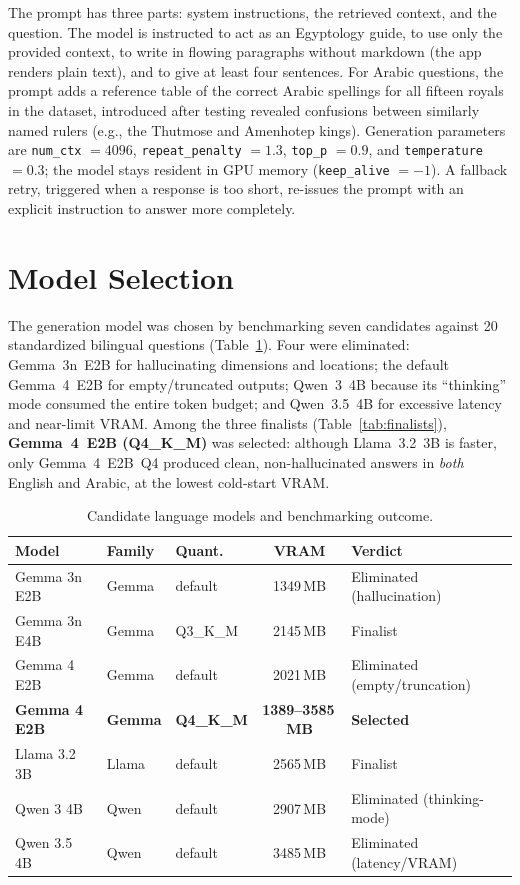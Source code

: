 The prompt has three parts: system instructions, the retrieved context, and the
question. The model is instructed to act as an Egyptology guide, to use only the
provided context, to write in flowing paragraphs without markdown (the app renders
plain text), and to give at least four sentences. For Arabic questions, the prompt adds
a reference table of the correct Arabic spellings for all fifteen royals in the dataset,
introduced after testing revealed confusions between similarly named rulers
(e.g., the Thutmose and Amenhotep kings). Generation parameters are \texttt{num\_ctx}
$=4096$, \texttt{repeat\_penalty} $=1.3$, \texttt{top\_p} $=0.9$, and
\texttt{temperature} $=0.3$; the model stays resident in GPU memory
(\texttt{keep\_alive} $=-1$). A fallback retry, triggered when a response is too short,
re-issues the prompt with an explicit instruction to answer more completely.

\section{Model Selection}

The generation model was chosen by benchmarking seven candidates against 20
standardized bilingual questions (Table~\ref{tab:funnel}). Four were eliminated:
Gemma~3n~E2B for hallucinating dimensions and locations; the default Gemma~4~E2B for
empty/truncated outputs; Qwen~3~4B because its ``thinking'' mode consumed the entire
token budget; and Qwen~3.5~4B for excessive latency and near-limit VRAM. Among the
three finalists (Table~\ref{tab:finalists}), \textbf{Gemma~4~E2B (Q4\_K\_M)} was
selected: although Llama~3.2~3B is faster, only Gemma~4~E2B~Q4 produced clean,
non-hallucinated answers in \emph{both} English and Arabic, at the lowest cold-start
VRAM.

\begin{table}[htbp]
\centering\small
\setlength{\tabcolsep}{4pt}
\caption{Candidate language models and benchmarking outcome.}
\label{tab:funnel}
\begin{tabular}{@{}lllcl@{}}
\toprule
\textbf{Model} & \textbf{Family} & \textbf{Quant.} & \textbf{VRAM} & \textbf{Verdict}\\
\midrule
Gemma 3n E2B   & Gemma & default & 1349\,MB & Eliminated (hallucination)\\
Gemma 3n E4B   & Gemma & Q3\_K\_M & 2145\,MB & Finalist\\
Gemma 4 E2B    & Gemma & default & 2021\,MB & Eliminated (empty/truncation)\\
\textbf{Gemma 4 E2B} & \textbf{Gemma} & \textbf{Q4\_K\_M} & \textbf{1389--3585\,MB} & \textbf{Selected}\\
Llama 3.2 3B   & Llama & default & 2565\,MB & Finalist\\
Qwen 3 4B      & Qwen  & default & 2907\,MB & Eliminated (thinking-mode)\\
Qwen 3.5 4B    & Qwen  & default & 3485\,MB & Eliminated (latency/VRAM)\\
\bottomrule
\end{tabular}
\end{table}

